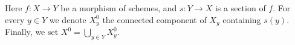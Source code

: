 \begin{situation}
\label{situation-connected-along-section}
Here $f : X \to Y$ be a morphism of schemes, and
$s : Y \to X$ is a section of $f$.
For every $y \in Y$ we denote $X^0_y$ the connected component of $X_y$
containing $s(y)$. Finally, we set $X^0 = \bigcup_{y \in Y} X^0_y$.
\end{situation}